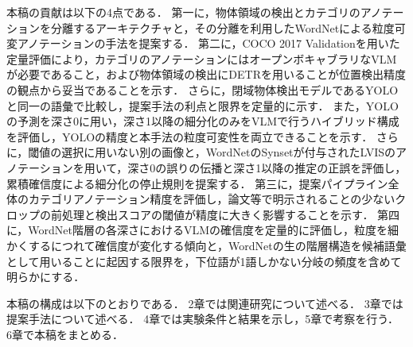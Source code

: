 本稿の貢献は以下の4点である．
第一に，物体領域の検出とカテゴリのアノテーションを分離するアーキテクチャと，その分離を利用したWordNetによる粒度可変アノテーションの手法を提案する．
第二に，COCO 2017 Validationを用いた定量評価により，カテゴリのアノテーションにはオープンボキャブラリなVLMが必要であること，および物体領域の検出にDETRを用いることが位置検出精度の観点から妥当であることを示す．
さらに，閉域物体検出モデルであるYOLOと同一の語彙で比較し，提案手法の利点と限界を定量的に示す．
また，YOLOの予測を深さ0に用い，深さ1以降の細分化のみをVLMで行うハイブリッド構成を評価し，YOLOの精度と本手法の粒度可変性を両立できることを示す．
さらに，閾値の選択に用いない別の画像と，WordNetのSynsetが付与されたLVISのアノテーションを用いて，深さ0の誤りの伝播と深さ1以降の推定の正誤を評価し，累積確信度による細分化の停止規則を提案する．
第三に，提案パイプライン全体のカテゴリアノテーション精度を評価し，論文等で明示されることの少ないクロップの前処理と検出スコアの閾値が精度に大きく影響することを示す．
第四に，WordNet階層の各深さにおけるVLMの確信度を定量的に評価し，粒度を細かくするにつれて確信度が変化する傾向と，WordNetの生の階層構造を候補語彙として用いることに起因する限界を，下位語が1語しかない分岐の頻度を含めて明らかにする．

本稿の構成は以下のとおりである．
2章では関連研究について述べる．
3章では提案手法について述べる．
4章では実験条件と結果を示し，5章で考察を行う．
6章で本稿をまとめる．
